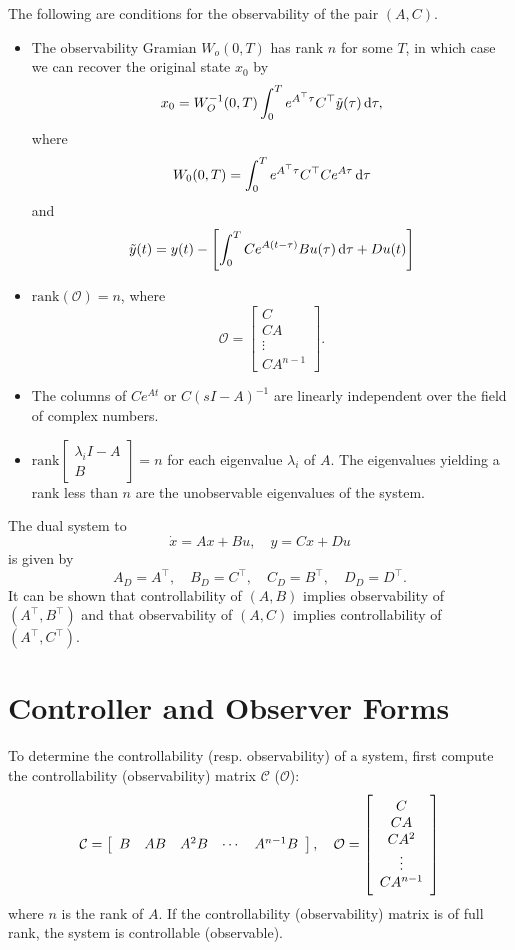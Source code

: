 \documentclass{report}
\begin{document}
The following are conditions for the observability of the pair
$(A,C)$.
\begin{itemize}
  \item{
    The observability Gramian $W_o(0, T)$ has rank $n$ for some $T$,
    in which case we can recover the original state $x_0$ by
    $$
    x_0 =
    W_O^{-1}(0, T)\int_0^T e^{A^\top \tau} C^\top \tilde{y}(\tau) \dif
    \tau,
    $$
    where
    $$
    W_0(0, T) = \int_0^T e^{A^\top \tau} C^\top C e^{A \tau} \dif \tau
    $$
    and
    $$
    \tilde{y}(t)
    = y(t)
    - \left[
        \int_0^T C e^{A(t - \tau)} B u(\tau) \dif \tau + D u(t)
      \right]
    $$
  }
  \item{
    $\mathrm{rank}(\mathcal{O}) = n$, where
    $$
    \mathcal{O} =
    \left[\begin{array}{c}
      C        \\
      C A      \\
      \vdots   \\
      C A^{n-1}
    \end{array}\right].
    $$
  }
  \item{
    The columns of $C e^{A t}$ or $C (sI - A)^{-1}$ are linearly independent over the field
    of complex numbers.
  }
  \item{
    $\mathrm{rank}
       \left[\begin{array}{c}
         \lambda_i I - A \\
         B
       \end{array}\right] = n$ for each eigenvalue $\lambda_i$
    of $A$. The eigenvalues yielding a rank less than $n$ are the
    unobservable eigenvalues of the system.
  }
\end{itemize}

The dual system to
$$
\dot{x} = A x + B u, \quad
y = C x + D u
$$
is given by
$$
A_D = A^\top, \quad
B_D = C^\top, \quad
C_D = B^\top, \quad
D_D = D^\top.
$$
It can be shown that controllability of $(A, B)$ implies observability
of $(A^\top, B^\top)$ and that observability of $(A, C)$ implies
controllability of $(A^\top, C^\top)$.

\section{Controller and Observer Forms}

To determine the controllability (resp. observability) of a system, first compute
the controllability (observability) matrix $\mathcal{C}$ ($\mathcal{O}$):
$$
\mathcal{C} =
\left[\begin{array}{c c c c c}
  B & A B & A^2 B & \cdots & A^{n-1} B
\end{array}\right], \quad
\mathcal{O} =
\left[\begin{array}{c}
  C        \\
  C A      \\
  C A^2    \\
  \vdots   \\
  C A^{n-1}
\end{array}\right]
$$
where $n$ is the rank of $A$. If the controllability (observability)
matrix is of full rank, the system is controllable (observable).
\end{document}
